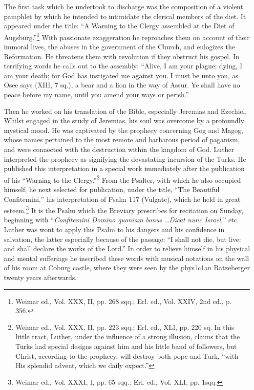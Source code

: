 The first task which he undertook to discharge was the composition
of a violent pamphlet by which he intended to intimidate the clerical
members of the diet. It appeared under the title: “A Warning to the
Clergy assembled at the Diet of Augsburg.”\footnote
{Weimar ed., Vol. XXX, II, pp. 268 sqq.; Erl. ed., Vol. XXIV, 2nd ed., p. 356.}
With passionate exaggeration
he reproaches them on account of their immoral lives, the
abuses in the government of the Church, and eulogizes the Reformation.
He threatens them with revolution if they obstruct his gospel.
In terrifying words he calls out to the assembly: “Alive, I am your
plague; dying, I am your death; for God has instigated me against you.
I must be unto you, as Osee says (XIII, 7 sq.), a bear and a lion in the
way of Assur. Ye shall have no peace before my name, until you
amend your ways or perish.”

Then he worked on his translation of the Bible, especially Jeremias
and Ezechiel. Whilst engaged in the study of Jeremias, his soul was
overcome by a profoundly mystical mood. He was captivated by the
prophecy concerning Gog and Magog, whose names pertained to the
most remote and barbarous period of paganism, and were connected
with the destruction within the kingdom of God. Luther interpreted
the prophecy as signifying the devastating incursion of the Turks. He
published this interpretation in a special work immediately after the
publication of his “Warning to the Clergy.”\footnote
{Weimar ed., Vol. XXX, II, pp. 223 sqq.; Erl. ed., XLI, pp. 220 sq. In this little tract,
Luther, under the influence of a strong illusion, claims that the Turks had special designs
against him and his little band of followers, but Christ, according to the prophecy, will
destroy both pope and Turk, “with His splendid advent, which we daily expect.”}
From the Psalter, with
which he also occupied himself, he next selected for publication, under
the title, “The Beautiful Confitemini,” his interpretation of Psalm 117
(Vulgate), which he held in great esteem.\footnote
{Weimar ed., Vol. XXXI, I, pp. 65 sqq.; Erl. ed., Vol. XLI, pp. 1sqq.}
It is the Psalm which the
Breviary prescribes for recitation on Sunday, beginning with “\textit{Confitemini
Domino quoniam bonus \dots Dicat nunc Israel},” etc. Luther
was wont to apply this Psalm to his dangers and his confidence in
salvation, the latter especially because of the passage: “I shall not die,
but live: and shall declare the works of the Lord.” In order to relieve
himself in his physical and mental sufferings he inscribed these words
with musical notations on the wall of his room at Coburg castle,
where they were seen by the phys1c1an Ratzeberger twenty years
afterwards.

